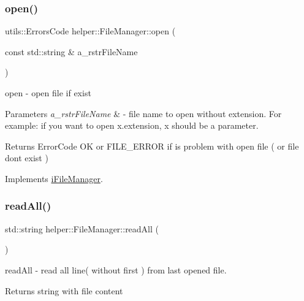 \subsubsection{\texorpdfstring{open()}{open()}}
{\footnotesize\ttfamily utils\+::\+Errors\+Code helper\+::\+File\+Manager\+::open (\begin{DoxyParamCaption}\item[{const std\+::string \&}]{a\+\_\+rstr\+File\+Name }\end{DoxyParamCaption})\hspace{0.3cm}{\ttfamily [virtual]}}



open -\/ open file if exist 


\begin{DoxyParams}{Parameters}
{\em a\+\_\+rstr\+File\+Name} & -\/ file name to open without extension. For example\+: if you want to open x.\+extension, x should be a parameter. \\
\hline
\end{DoxyParams}
\begin{DoxyReturn}{Returns}
Error\+Code OK or F\+I\+L\+E\+\_\+\+E\+R\+R\+OR if is problem with open file ( or file dont exist ) 
\end{DoxyReturn}


Implements \mbox{\hyperlink{classi_file_manager}{i\+File\+Manager}}.

\mbox{\label{classhelper_1_1_file_manager_acfae3833526e6306859612f5a1203960}} 
\subsubsection{\texorpdfstring{readAll()}{readAll()}}
{\footnotesize\ttfamily std\+::string helper\+::\+File\+Manager\+::read\+All (\begin{DoxyParamCaption}{ }\end{DoxyParamCaption})\hspace{0.3cm}{\ttfamily [virtual]}}



read\+All -\/ read all line( without first ) from last opened file. 

\begin{DoxyReturn}{Returns}
string with file content 
\end{DoxyReturn}


